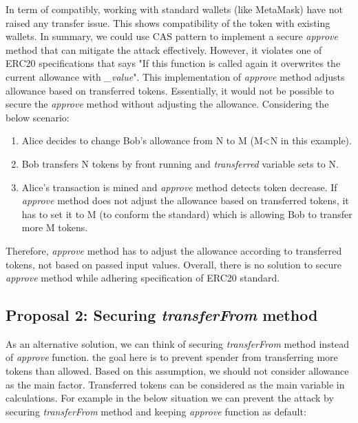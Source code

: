 In term of compatibly, working with standard wallets (like MetaMask) have not raised any transfer issue. This shows compatibility of the token with existing wallets. In summary, we could use CAS pattern to implement a secure \textit{approve} method that can mitigate the attack effectively. However, it violates one of ERC20 specifications that says "If this function is called again it overwrites the current allowance with \textit{\_value}". This implementation of \textit{approve} method adjusts allowance based on transferred tokens. Essentially, it would not be possible to secure the \textit{approve} method without adjusting the allowance. Considering the below scenario:

\begin{enumerate}
	\item Alice decides to change Bob's allowance from N to M (M<N in this example).
	\item Bob transfers N tokens by front running and \textit{transferred} variable sets to N.
	\item Alice's transaction is mined and \textit{approve} method detects token decrease. If \textit{approve} method does not adjust the allowance based on transferred tokens, it has to set it to M (to conform the standard) which is allowing Bob to transfer more M tokens.
\end{enumerate}

Therefore, \textit{approve} method has to adjust the allowance according to transferred tokens, not based on passed input values. Overall, there is no solution to secure \textit{approve} method while adhering specification of ERC20 standard.

\subsection{Proposal 2: Securing \textit{transferFrom} method}

As an alternative solution, we can think of securing \textit{transferFrom} method instead of \textit{approve} function. the goal here is to prevent spender from transferring more tokens than allowed. Based on this assumption, we should not consider allowance as the main factor. Transferred tokens can be considered as the main variable in calculations. For example in the below situation we can prevent the attack by securing \textit{transferFrom} method and keeping \textit{approve} function as default:

